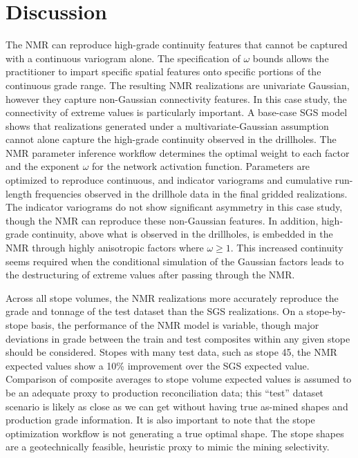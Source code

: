 \FloatBarrier
\section{Discussion}
\label{sec:discuss06}

The \gls{NMR} can reproduce high-grade continuity features that cannot be captured with a continuous variogram alone. The specification of $\omega$ bounds allows the practitioner to impart specific spatial features onto specific portions of the continuous grade range. The resulting \gls{NMR} realizations are univariate Gaussian, however they capture non-Gaussian connectivity features. In this case study, the connectivity of extreme values is particularly important. A base-case \gls{SGS} model shows that realizations generated under a multivariate-Gaussian assumption cannot alone capture the high-grade continuity observed in the drillholes. The \gls{NMR} parameter inference workflow determines the optimal weight to each factor and the exponent $\omega$ for the network activation function. Parameters are optimized to reproduce continuous, and indicator variograms and cumulative run-length frequencies observed in the drillhole data in the final gridded realizations. The indicator variograms do not show significant asymmetry in this case study, though the \gls{NMR} can reproduce these non-Gaussian features. In addition, high-grade continuity, above what is observed in the drillholes, is embedded in the \gls{NMR} through highly anisotropic factors where $\omega \ge 1$. This increased continuity seems required when the conditional simulation of the Gaussian factors leads to the destructuring of extreme values after passing through the \gls{NMR}.

Across all stope volumes, the \gls{NMR} realizations more accurately reproduce the grade and tonnage of the test dataset than the \gls{SGS} realizations. On a stope-by-stope basis, the performance of the \gls{NMR} model is variable, though major deviations in grade between the train and test composites within any given stope should be considered. Stopes with many test data, such as stope 45, the \gls{NMR} expected values show a 10\% improvement over the \gls{SGS} expected value. Comparison of composite averages to stope volume expected values is assumed to be an adequate proxy to production reconciliation data; this ``test'' dataset scenario is likely as close as we can get without having true as-mined shapes and production grade information. It is also important to note that the stope optimization workflow is not generating a true optimal shape. The stope shapes are a geotechnically feasible, heuristic proxy to mimic the mining selectivity.


